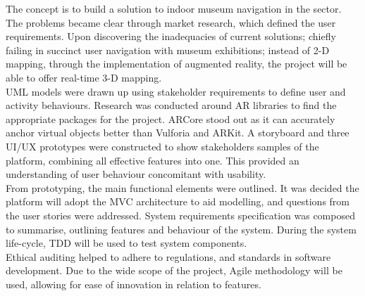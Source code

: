 
The concept is to build a solution to indoor museum navigation in the sector. The problems became clear through market research, which defined the user requirements. Upon discovering the inadequacies of current solutions; chiefly failing in succinct user navigation with museum exhibitions; instead of 2-D mapping, through the implementation of augmented reality, the project will be able to offer real-time 3-D mapping.\\

UML models were drawn up using stakeholder requirements to define user and activity behaviours. Research was conducted around AR libraries to find the appropriate packages for the project. ARCore stood out as it can accurately anchor virtual objects better than Vulforia and ARKit. A storyboard and three UI/UX prototypes were constructed to show stakeholders samples of the platform, combining all effective features into one. This provided an understanding of user behaviour concomitant with
usability.\\ 

From prototyping, the main functional elements were outlined. It was decided the platform will adopt the MVC architecture to aid modelling, and questions from the user stories were addressed. System requirements specification was composed to summarise, outlining features and behaviour of the system. During the system life-cycle, TDD will be used to test system components.\\ 

Ethical auditing helped to adhere to regulations, and standards in software development. Due to the wide scope of the project, Agile methodology will be used, allowing for ease of innovation in relation to features.
